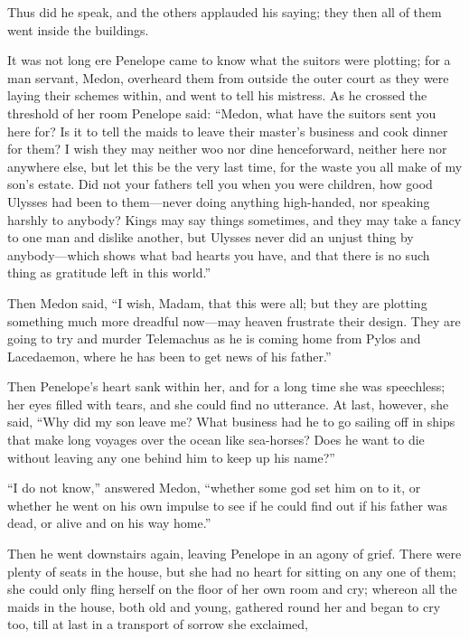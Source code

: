 Thus did he speak, and the others applauded his saying; they then all of them
went inside the buildings.

It was not long ere Penelope came to know what the suitors were plotting; for a
man servant, Medon, overheard them from outside the outer court as they were
laying their schemes within, and went to tell his mistress. As he crossed the
threshold of her room Penelope said: “Medon, what have the suitors sent you
here for? Is it to tell the maids to leave their master’s business and cook
dinner for them? I wish they may neither woo nor dine henceforward, neither
here nor anywhere else, but let this be the very last time, for the waste you
all make of my son’s estate. Did not your fathers tell you when you were
children, how good Ulysses had been to them—never doing anything high-handed,
nor speaking harshly to anybody? Kings may say things sometimes, and they may
take a fancy to one man and dislike another, but Ulysses never did an unjust
thing by anybody—which shows what bad hearts you have, and that there is no
such thing as gratitude left in this world.”

Then Medon said, “I wish, Madam, that this were all; but they are plotting
something much more dreadful now—may heaven frustrate their design. They are
going to try and murder Telemachus as he is coming home from Pylos and
Lacedaemon, where he has been to get news of his father.”

Then Penelope’s heart sank within her, and for a long time she was speechless;
her eyes filled with tears, and she could find no utterance. At last, however,
she said, “Why did my son leave me? What business had he to go sailing off in
ships that make long voyages over the ocean like sea-horses? Does he want to
die without leaving any one behind him to keep up his name?”

“I do not know,” answered Medon, “whether some god set him on to it, or whether
he went on his own impulse to see if he could find out if his father was dead,
or alive and on his way home.”

Then he went downstairs again, leaving Penelope in an agony of grief. There
were plenty of seats in the house, but she had no heart for sitting on any one
of them; she could only fling herself on the floor of her own room and cry;
whereon all the maids in the house, both old and young, gathered round her and
began to cry too, till at last in a transport of sorrow she exclaimed,

